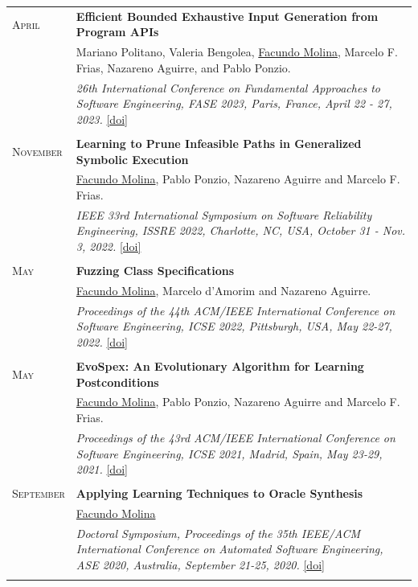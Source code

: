 \documentclass[a4paper,10pt]{article} %
\begin{document}
\begin{longtable}{>{\raggedleft\arraybackslash}p{} p{}}
\textsc{April} & \textbf{Efficient Bounded Exhaustive Input Generation from Program APIs} \\
        2023 & Mariano Politano, Valeria Bengolea, \underline{Facundo Molina}, Marcelo F. Frias, Nazareno Aguirre, and Pablo Ponzio. \\
	& \textit{26th International Conference on Fundamental Approaches to Software Engineering, FASE 2023, Paris, France, April 22 - 27, 2023.} \href{https://doi.org/10.1007/978-3-031-30826-0_6}{[doi]}\\ & \\

\textsc{November} & \textbf{Learning to Prune Infeasible Paths in Generalized Symbolic Execution} \\
        2022& \underline{Facundo Molina}, Pablo Ponzio, Nazareno Aguirre and Marcelo F. Frias.\\
        & \textit{IEEE 33rd International Symposium on Software Reliability Engineering, ISSRE 2022, Charlotte, NC, USA, October 31 - Nov. 3, 2022.} \href{https://doi.org/10.1109/ISSRE55969.2022.00054}{[doi]} \\ & \\

\textsc{May} & \textbf{Fuzzing Class Specifications} \\
	2022 & \underline{Facundo Molina}, Marcelo d'Amorim and Nazareno Aguirre. \\
	& \textit{Proceedings of the 44th ACM/IEEE International Conference on Software Engineering, ICSE 2022, Pittsburgh, USA, May 22-27, 2022.} \href{https://dl.acm.org/doi/abs/10.1145/3510003.3510120}{[doi]} \\ & \\

\textsc{May}  & \textbf{EvoSpex: An Evolutionary Algorithm for Learning Postconditions} \\
2021 & \underline{Facundo Molina}, Pablo Ponzio, Nazareno Aguirre and Marcelo F. Frias. \\
& \textit{Proceedings of the 43rd ACM/IEEE International Conference on Software Engineering, ICSE 2021, Madrid, Spain, May 23-29, 2021.} \href{https://doi.ieeecomputersociety.org/10.1109/ICSE43902.2021.00112}{[doi]} \\ & \\

\textsc{September}  & \textbf{Applying Learning Techniques to Oracle Synthesis} \\
2020 & \underline{Facundo Molina} \\
& \textit{Doctoral Symposium, Proceedings of the 35th IEEE/ACM International Conference on Automated Software Engineering, ASE 2020, Australia, September 21-25, 2020.} \href{https://dl.acm.org/doi/10.1145/3324884.3415287}{[doi]} \\ & \\


\end{longtable}
\end{document}
